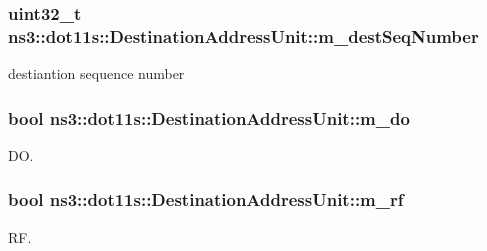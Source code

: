 \subsubsection[{\texorpdfstring{m\+\_\+dest\+Seq\+Number}{m_destSeqNumber}}]{\setlength{\rightskip}{0pt plus 5cm}uint32\+\_\+t ns3\+::dot11s\+::\+Destination\+Address\+Unit\+::m\+\_\+dest\+Seq\+Number\hspace{0.3cm}{\ttfamily [private]}}\hypertarget{classns3_1_1dot11s_1_1DestinationAddressUnit_abde24de824eb5a3e4bae44785b196f5e}{}\label{classns3_1_1dot11s_1_1DestinationAddressUnit_abde24de824eb5a3e4bae44785b196f5e}


destiantion sequence number 

\subsubsection[{\texorpdfstring{m\+\_\+do}{m_do}}]{\setlength{\rightskip}{0pt plus 5cm}bool ns3\+::dot11s\+::\+Destination\+Address\+Unit\+::m\+\_\+do\hspace{0.3cm}{\ttfamily [private]}}\hypertarget{classns3_1_1dot11s_1_1DestinationAddressUnit_a77cff681b3a48daeb4c64522f89782a1}{}\label{classns3_1_1dot11s_1_1DestinationAddressUnit_a77cff681b3a48daeb4c64522f89782a1}


DO. 

\subsubsection[{\texorpdfstring{m\+\_\+rf}{m_rf}}]{\setlength{\rightskip}{0pt plus 5cm}bool ns3\+::dot11s\+::\+Destination\+Address\+Unit\+::m\+\_\+rf\hspace{0.3cm}{\ttfamily [private]}}\hypertarget{classns3_1_1dot11s_1_1DestinationAddressUnit_aaa7b8cfd99e88d323396ff9e2fc1e913}{}\label{classns3_1_1dot11s_1_1DestinationAddressUnit_aaa7b8cfd99e88d323396ff9e2fc1e913}


RF. 

